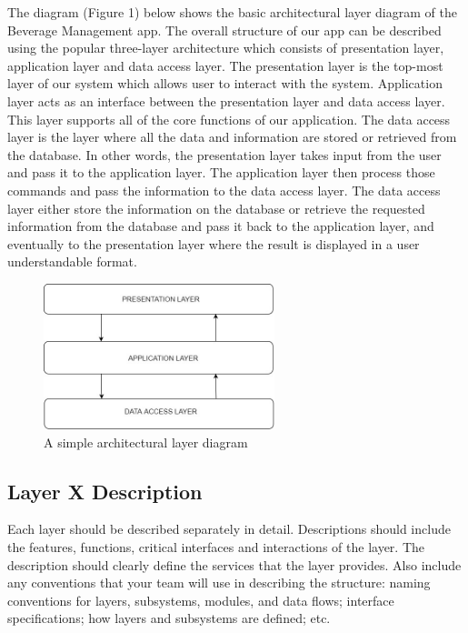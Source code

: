 The diagram (Figure 1) below shows the basic architectural layer diagram of the Beverage Management app. The overall structure of our app can be described using the popular three-layer architecture which consists of presentation layer, application layer and data access layer. The presentation layer is the top-most layer of our system which allows user to interact with the system. Application layer acts as an interface between the presentation layer and data access layer. This layer supports all of the core functions of our application. The data access layer is the layer where all the data and information are stored or retrieved from the database. In other words, the presentation layer takes input from the user and pass it to the application layer. The application layer then process those commands and pass the information to the data access layer. The data access layer either store the information on the database or retrieve the requested information from the database and pass it back to the application layer, and eventually to the presentation layer where the result is displayed in a user understandable format. 

\begin{figure}[h!]
	\centering
 	\includegraphics[width=0.60\textwidth]{images/ADS}
 \caption{A simple architectural layer diagram}
\end{figure}

\subsection{Layer X Description}
Each layer should be described separately in detail. Descriptions should include the features, functions, critical interfaces and interactions of the layer. The description should clearly define the services that the layer provides. Also include any conventions that your team will use in describing the structure: naming conventions for layers, subsystems, modules, and data flows; interface specifications; how layers and subsystems are defined; etc. 

